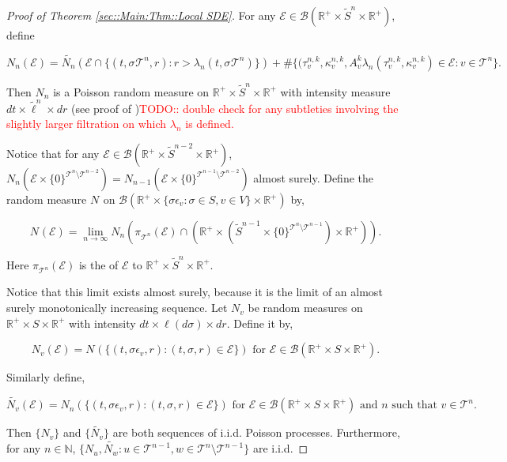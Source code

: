 \documentclass[12pt]{article}
\newcommand{\mb}{\mathbb}
\newcommand{\mc}{\mathcal}
\newcommand{\ms}{\mathscr}
\newcommand{\ra}{\rightarrow}
\newcommand{\te}{\text}
\newcommand{\ep}{\epsilon}
\newcommand{\tr}{\textcolor{red}}
\newcommand{\ind}{\hspace{24pt}}
\renewcommand{\v}{v}							%
\newcommand{\vv}{u}								%
\newcommand{\vvv}{w}							%
\renewcommand{\S}{S}							%
\newcommand{\s}{\sigma}							%
\newcommand{\sv}[1]{\s^{#1}}					%
\newcommand{\ev}[1]{\ep_{#1}}					%
\renewcommand{\t}{t}							%
\newcommand{\poiss}[1]{N_{#1}}						%
\newcommand{\pup}[1]{^{#1}}							%
\newcommand{\tree}{\mc{T}}							%
\newcommand{\V}{V}									%
\renewcommand{\r}{r}								%
\newcommand{\rt}[1]{\tau^{#1}}						%
\renewcommand{\it}{k}								%
\newcommand{\numb}{n}								%
\newcommand{\XState}[1]{\S^{#1}}				%
\newcommand{\piV}[2]{\pi_{#1}^{#2}}					%
\newcommand{\rate}[1]{\lambda_{#1}}					%
\newcommand{\Sm}{\ell}								%
\newcommand{\alt}{\widetilde}						%
\newcommand{\rv}{A}								%
\newcommand{\evnt}{\mc{E}}						%
\renewcommand{\mark}[1]{\kappa^{#1}}				%
\begin{document}
\begin{proof}[Proof of Theorem \ref{sec::Main:Thm::Local SDE}]
For any \(\evnt \in \ms{B}(\mb{R}^+\times\alt{\S}^\numb\times\mb{R}^+)\), define

\[\poiss{\numb}(\evnt) = \alt{\poiss{\numb}}\left(\evnt\cap\{(t,\sv{}{\tree\pup{\numb}},\r):\r > \rate{\numb}(\t,\sv{}{\tree\pup{\numb}})\}\right) + \#\{(\rt{\numb,\it}_\v,\mark{\numb,\it}_\v,\rv_{\v}^{\it}\rate{\numb}(\rt{\numb,\it}_\v,\mark{\numb,\it}_\v) \in \evnt: \v\in \tree\pup{\numb}\}.\]

Then \(\poiss{\numb}\) is a Poisson random measure on \(\mb{R}^+\times\alt{\S}^\numb\times \mb{R}^+\) with intensity measure \(d\t\times \alt{\Sm}^\numb\times d\r\) (see proof of \cite[Theorem 14.7.1(b)]{DalVer08})\tr{TODO:: double check for any subtleties involving the slightly larger filtration on which \(\rate{\numb}\) is defined.}

\ind Notice that for any \(\evnt \in \ms{B}(\mb{R}^+\times \alt{\S}^{\numb-2}\times \mb{R}^+)\), \(\poiss{\numb}(\evnt\times \{0\}^{\tree\pup{\numb}\setminus\tree\pup{\numb-2}}) = \poiss{\numb-1}(\evnt\times\{0\}^{\tree\pup{\numb-1}\setminus\tree\pup{\numb-2}})\) almost surely. Define the random measure \(\poiss{}\) on \(\ms{B}(\mb{R}^+\times \{\s\ev{\v}:\s\in \S,\v \in \V\}\times \mb{R}^+)\) by,

\[\poiss{}(\evnt) = \lim_{\numb \ra\infty}\poiss{\numb}\left(\piV{\tree\pup{\numb}}{}(\evnt)\cap\left(\mb{R}^+\times(\alt{\S}^{\numb-1}\times\{0\}^{\tree\pup{\numb}\setminus\tree\pup{\numb-1}})\times\mb{R}^+\right)\right).\]

Here \(\piV{\tree\pup{\numb}}{}(\evnt)\) is the of \(\evnt\) to \(\mb{R}^+\times \alt{\S}^\numb\times\mb{R}^+\). 

\ind Notice that this limit exists almost surely, because it is the limit of an almost surely monotonically increasing sequence. Let \(\poiss{\v}\) be random measures on \(\mb{R}^+\times\S\times\mb{R}^+\) with intensity \(d\t\times\Sm(d\s)\times d\r\). Define it by,

\[\poiss{\v}(\evnt) = \poiss{}\left(\{(\t,\s\ev{\v},\r):(\t,\s,\r)\in \evnt\}\right) \te{ for } \evnt \in \ms{B}(\mb{R}^+\times\S\times\mb{R}^+).\]

Similarly define,

\[\alt{\poiss{\v}}(\evnt) = \poiss{\numb}\left(\{(\t,\s\ev{\v},\r):(\t,\s,\r)\in \evnt\}\right)\te{ for } \evnt \in \ms{B}(\mb{R}^+\times\S\times\mb{R}^+)\te{ and }\numb\te{ such that } \v\in \tree\pup{\numb}.\]

Then \(\{\poiss{\v}\}\) and \(\{\alt{\poiss{\v}}\}\) are both sequences of i.i.d. Poisson processes. Furthermore, for any \(\numb \in \mb{N}\), \(\{\poiss{\vv},\alt{\poiss{\vvv}}:\vv\in \tree\pup{\numb-1},\vvv\in\tree\pup{\numb}\setminus\tree\pup{\numb-1}\}\) are i.i.d.


\end{proof}
\end{document}
